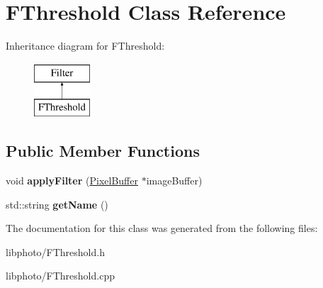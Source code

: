 \hypertarget{classFThreshold}{\section{F\-Threshold Class Reference}
\label{classFThreshold}
}
Inheritance diagram for F\-Threshold\-:\begin{figure}[H]
\begin{center}
\leavevmode
\includegraphics[height=2.000000cm]{classFThreshold}
\end{center}
\end{figure}
\subsection*{Public Member Functions}
\begin{DoxyCompactItemize}
\item 
\hypertarget{classFThreshold_a324dadf15c23bd2d2edf6ea32e3d87f6}{void {\bfseries apply\-Filter} (\hyperlink{classPixelBuffer}{Pixel\-Buffer} $\ast$image\-Buffer)}\label{classFThreshold_a324dadf15c23bd2d2edf6ea32e3d87f6}

\item 
\hypertarget{classFThreshold_a189f8f15c0719706a7eb191b198c0b15}{std\-::string {\bfseries get\-Name} ()}\label{classFThreshold_a189f8f15c0719706a7eb191b198c0b15}

\end{DoxyCompactItemize}


The documentation for this class was generated from the following files\-:\begin{DoxyCompactItemize}
\item 
libphoto/F\-Threshold.\-h\item 
libphoto/F\-Threshold.\-cpp\end{DoxyCompactItemize}

